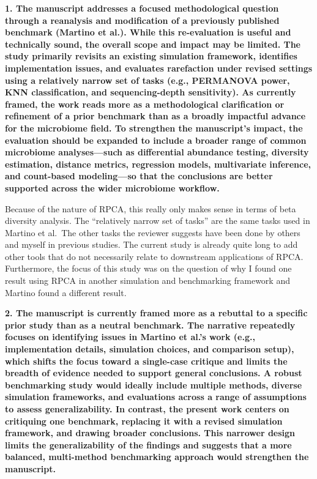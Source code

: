 \documentclass[
  11pt,
]{article}
\begin{document}
\textbf{1. The manuscript addresses a focused methodological question
through a reanalysis and modification of a previously published
benchmark (Martino et al.). While this re-evaluation is useful and
technically sound, the overall scope and impact may be limited. The
study primarily revisits an existing simulation framework, identifies
implementation issues, and evaluates rarefaction under revised settings
using a relatively narrow set of tasks (e.g., PERMANOVA power, KNN
classification, and sequencing-depth sensitivity). As currently framed,
the work reads more as a methodological clarification or refinement of a
prior benchmark than as a broadly impactful advance for the microbiome
field. To strengthen the manuscript's impact, the evaluation should be
expanded to include a broader range of common microbiome analyses---such
as differential abundance testing, diversity estimation, distance
metrics, regression models, multivariate inference, and count-based
modeling---so that the conclusions are better supported across the wider
microbiome workflow.}

Because of the nature of RPCA, this really only makes sense in terms of
beta diversity analysis. The ``relatively narrow set of tasks'' are the
same tasks used in Martino et al.~The other tasks the reviewer suggests
have been done by others and myself in previous studies. The current
study is already quite long to add other tools that do not necessarily
relate to downstream applications of RPCA. Furthermore, the focus of
this study was on the question of why I found one result using RPCA in
another simulation and benchmarking framework and Martino found a
different result.

\textbf{2. The manuscript is currently framed more as a rebuttal to a
specific prior study than as a neutral benchmark. The narrative
repeatedly focuses on identifying issues in Martino et al.'s work (e.g.,
implementation details, simulation choices, and comparison setup), which
shifts the focus toward a single-case critique and limits the breadth of
evidence needed to support general conclusions. A robust benchmarking
study would ideally include multiple methods, diverse simulation
frameworks, and evaluations across a range of assumptions to assess
generalizability. In contrast, the present work centers on critiquing
one benchmark, replacing it with a revised simulation framework, and
drawing broader conclusions. This narrower design limits the
generalizability of the findings and suggests that a more balanced,
multi-method benchmarking approach would strengthen the manuscript.}
\end{document}
